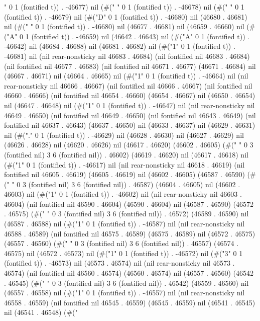 " 0 1 (fontified t)) . -46677) nil (#(" " 0 1 (fontified t)) . -46678) nil (#(" " 0 1 (fontified t)) . -46679) nil (#("D" 0 1 (fontified t)) . -46680) nil (46680 . 46681) nil (#(" " 0 1 (fontified t)) . -46680) nil (46677 . 46681) nil (46659 . 46660) nil (#("A" 0 1 (fontified t)) . -46659) nil (46642 . 46643) nil (#("A" 0 1 (fontified t)) . -46642) nil (46684 . 46688) nil (46681 . 46682) nil (#("1" 0 1 (fontified t)) . -46681) nil (nil rear-nonsticky nil 46683 . 46684) (nil fontified nil 46683 . 46684) (nil fontified nil 46677 . 46683) (nil fontified nil 46671 . 46677) (46671 . 46684) nil (46667 . 46671) nil (46664 . 46665) nil (#("1" 0 1 (fontified t)) . -46664) nil (nil rear-nonsticky nil 46666 . 46667) (nil fontified nil 46666 . 46667) (nil fontified nil 46660 . 46666) (nil fontified nil 46654 . 46660) (46654 . 46667) nil (46650 . 46654) nil (46647 . 46648) nil (#("1" 0 1 (fontified t)) . -46647) nil (nil rear-nonsticky nil 46649 . 46650) (nil fontified nil 46649 . 46650) (nil fontified nil 46643 . 46649) (nil fontified nil 46637 . 46643) (46637 . 46650) nil (46633 . 46637) nil (46629 . 46631) nil (#("." 0 1 (fontified t)) . -46629) nil (46628 . 46630) nil (46627 . 46629) nil (46626 . 46628) nil (46620 . 46626) nil (46617 . 46620) (46602 . 46605) (#("      " 0 3 (fontified nil) 3 6 (fontified nil)) . 46602) (46619 . 46620) nil (46617 . 46618) nil (#("1" 0 1 (fontified t)) . -46617) nil (nil rear-nonsticky nil 46618 . 46619) (nil fontified nil 46605 . 46619) (46605 . 46619) nil (46602 . 46605) (46587 . 46590) (#("      " 0 3 (fontified nil) 3 6 (fontified nil)) . 46587) (46604 . 46605) nil (46602 . 46603) nil (#("1" 0 1 (fontified t)) . -46602) nil (nil rear-nonsticky nil 46603 . 46604) (nil fontified nil 46590 . 46604) (46590 . 46604) nil (46587 . 46590) (46572 . 46575) (#("      " 0 3 (fontified nil) 3 6 (fontified nil)) . 46572) (46589 . 46590) nil (46587 . 46588) nil (#("1" 0 1 (fontified t)) . -46587) nil (nil rear-nonsticky nil 46588 . 46589) (nil fontified nil 46575 . 46589) (46575 . 46589) nil (46572 . 46575) (46557 . 46560) (#("      " 0 3 (fontified nil) 3 6 (fontified nil)) . 46557) (46574 . 46575) nil (46572 . 46573) nil (#("1" 0 1 (fontified t)) . -46572) nil (#("3" 0 1 (fontified t)) . -46573) nil (46573 . 46574) nil (nil rear-nonsticky nil 46573 . 46574) (nil fontified nil 46560 . 46574) (46560 . 46574) nil (46557 . 46560) (46542 . 46545) (#("      " 0 3 (fontified nil) 3 6 (fontified nil)) . 46542) (46559 . 46560) nil (46557 . 46558) nil (#("1" 0 1 (fontified t)) . -46557) nil (nil rear-nonsticky nil 46558 . 46559) (nil fontified nil 46545 . 46559) (46545 . 46559) nil (46541 . 46545) nil (46541 . 46548) (#("
